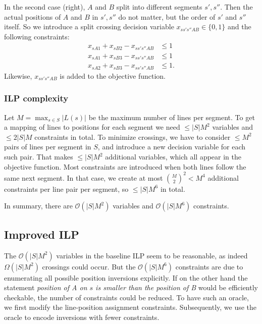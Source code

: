 \documentclass{llncs}
\begin{document}
In the second case (right), $A$ and $B$ split into different segments $s', s''$. Then the actual positions of $A$ and $B$ in $s', s''$ do not matter, but the order of $s'$ and $s''$ itself. So we introduce a split crossing decision variable $x_{ss's''AB} \in \{0,1\}$ and the following constraints:
\begin{align*}
	x_{sA1} + x_{sB2} - x_{ss's''AB} &\leq 1 \\
	x_{sA1} + x_{sB3} - x_{ss's''AB} &\leq 1 \\
	x_{sA2} + x_{sB3} - x_{ss's''AB} &\leq 1.
\end{align*}
Likewise, $x_{ss's''AB}$ is added to the objective function.

\subsubsection{ILP complexity}
Let $M = \max_{s \in S} |L(s)|$ be the maximum number of lines per segment. To get a mapping of lines to positions for each segment we need $\leq |S|M^{2}$ variables and $\leq 2|S|M$ constraints in total. To minimize crossings, we have to consider $\leq M^{2}$ pairs of lines per segment in $S$, and introduce a new decision variable for each such pair. That makes $\leq |S| M^{2}$ additional variables, which all appear in the objective function. Most constraints are introduced when both lines follow the same next segment. In that case, we create at most $\binom{M}{2}^{2} < M^{4}$ additional constraints per line pair per segment, so $\leq |S| M^{6}$ in total. 

In summary, there are $\mathcal{O}(|S|M^{2})$ variables and $\mathcal{O}(|S|M^{6})$ constraints.

%
\subsection{Improved ILP}\label{SEC:improved}
%
The $\mathcal{O}(|S|M^{2})$ variables in the baseline ILP seem to be reasonable, as indeed $\Omega(|S|M^{2})$ crossings could occur. But the $\mathcal{O}(|S|M^{6})$ constraints are due to enumerating all possible position inversions explicitly. If on the other hand the statement \emph{position of A on $s$ is smaller than the position of B} would be efficiently checkable, the number of constraints could be reduced. To have such an oracle, we first modify the line-position assignment constraints. Subsequently, we use  the oracle to encode inversions with fewer constraints.
\end{document}
